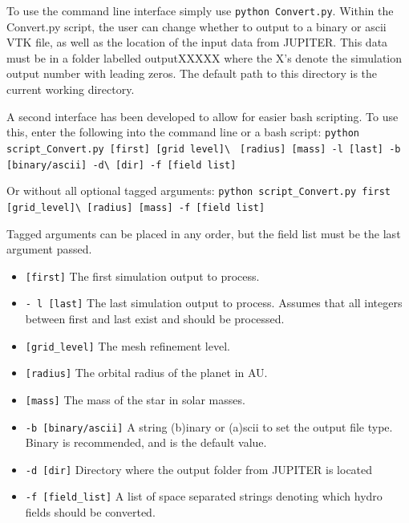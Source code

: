 \documentclass[twocolumn]{aastex62}
\begin{document}
To use the command line interface simply use \verb|python Convert.py|.
Within the Convert.py script, the user can change whether to output to a binary or ascii VTK file, as well as the location of the input data from JUPITER. This data must be in a folder labelled outputXXXXX where the X's denote the simulation output number with leading zeros. The default path to this directory is the current working directory.

A second interface has been developed to allow for easier bash scripting. To use this, enter the following into the command line or a bash script:
\verb|python script_Convert.py [first] [grid level]\ | \newline \verb|[radius] [mass] -l [last] -b [binary/ascii] -d\ |\newline\verb|[dir] -f [field list]|

Or without all optional tagged arguments:\newline
\verb|python script_Convert.py first [grid_level]\ |\newline \verb|[radius] [mass] -f [field list]|

Tagged arguments can be placed in any order, but the field list must be the last argument passed.
\begin{itemize}
	\item \verb|[first]| The first simulation output to process.
	\item \verb|- l [last]| The last simulation output to process. Assumes that all integers between first and last exist and should be processed.
	\item \verb|[grid_level]| The mesh refinement level.
	\item \verb|[radius]| The orbital radius of the planet in AU.
	\item \verb|[mass]| The mass of the star in solar masses.
	\item \verb|-b [binary/ascii]| A string (b)inary or (a)scii to set the output file type. Binary is recommended, and is the default value.
	\item \verb|-d [dir]| Directory where the output folder from JUPITER is located
	\item \verb|-f [field_list]| A list of space separated strings denoting which hydro fields should be converted.
\end{itemize}
\end{document}
